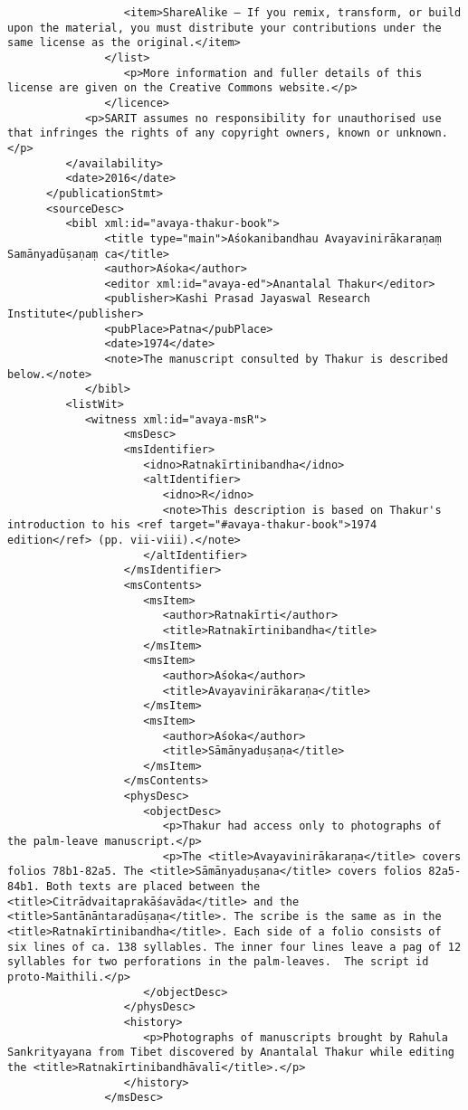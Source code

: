 \documentclass[article,12pt,a4paper]{memoir}%
\begin{document}
\begin{verbatim}
                  <item>ShareAlike — If you remix, transform, or build upon the material, you must distribute your contributions under the same license as the original.</item>
               </list>
	              <p>More information and fuller details of this license are given on the Creative Commons website.</p>
	           </licence>
            <p>SARIT assumes no responsibility for unauthorised use that infringes the rights of any copyright owners, known or unknown.</p>
         </availability>
         <date>2016</date>
      </publicationStmt>
      <sourceDesc>
         <bibl xml:id="avaya-thakur-book">
	           <title type="main">Aśokanibandhau Avayavinirākaraṇaṃ Samānyadūṣaṇaṃ ca</title>
	           <author>Aśoka</author>
	           <editor xml:id="avaya-ed">Anantalal Thakur</editor>
	           <publisher>Kashi Prasad Jayaswal Research Institute</publisher>
	           <pubPlace>Patna</pubPlace>
	           <date>1974</date>
	           <note>The manuscript consulted by Thakur is described below.</note>
	        </bibl>
         <listWit>
            <witness xml:id="avaya-msR">
	              <msDesc>
                  <msIdentifier>
                     <idno>Ratnakīrtinibandha</idno>
                     <altIdentifier>
                        <idno>R</idno>
                        <note>This description is based on Thakur's introduction to his <ref target="#avaya-thakur-book">1974 edition</ref> (pp. vii-viii).</note>
                     </altIdentifier>
                  </msIdentifier>
                  <msContents>
                     <msItem>
                        <author>Ratnakīrti</author>
                        <title>Ratnakīrtinibandha</title>
                     </msItem>
                     <msItem>
                        <author>Aśoka</author>
                        <title>Avayavinirākaraṇa</title>
                     </msItem>
                     <msItem>
                        <author>Aśoka</author>
                        <title>Sāmānyaduṣaṇa</title>
                     </msItem>
                  </msContents>
                  <physDesc>
                     <objectDesc>
                        <p>Thakur had access only to photographs of the palm-leave manuscript.</p>
                        <p>The <title>Avayavinirākaraṇa</title> covers folios 78b1-82a5. The <title>Sāmānyaduṣana</title> covers folios 82a5-84b1. Both texts are placed between the <title>Citrādvaitaprakāśavāda</title> and the <title>Santānāntaradūṣaṇa</title>. The scribe is the same as in the <title>Ratnakīrtinibandha</title>. Each side of a folio consists of six lines of ca. 138 syllables. The inner four lines leave a pag of 12 syllables for two perforations in the palm-leaves.  The script id proto-Maithili.</p>
                     </objectDesc>
                  </physDesc>
                  <history>
                     <p>Photographs of manuscripts brought by Rahula Sankrityayana from Tibet discovered by Anantalal Thakur while editing the <title>Ratnakīrtinibandhāvalī</title>.</p>
                  </history>
               </msDesc>


\end{verbatim}
\end{document}
